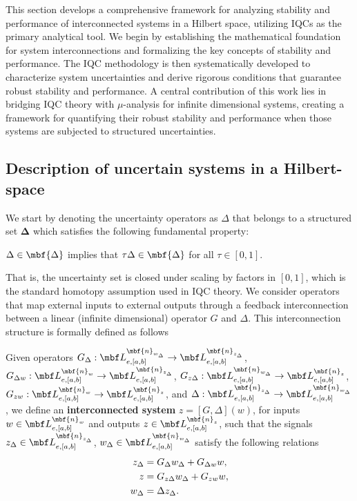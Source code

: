 This section develops a comprehensive framework for analyzing stability and performance of interconnected systems in a Hilbert space, utilizing IQCs as the primary analytical tool. We begin by establishing the mathematical foundation for system interconnections and formalizing the key concepts of stability and performance. The IQC methodology is then systematically developed to characterize system uncertainties and derive rigorous conditions that guarantee robust stability and performance. A central contribution of this work lies in bridging IQC theory with $\mu$-analysis for infinite dimensional systems, creating a framework for quantifying their robust stability and performance when those systems are subjected to structured uncertainties.
\subsection{Description of uncertain systems in a Hilbert-space}
We start by denoting the uncertainty operators as $\Delta$ that belongs to a structured set $\mathbf{\Delta}$ which satisfies the following fundamental property:
\begin{assumption}
	$\Delta\in\mbf{\Delta}$ implies that $\tau\Delta\in\mbf{\Delta}$ for all $\tau \in [0,1]$.
\end{assumption}
That is, the uncertainty set is closed under scaling by factors in $[0,1]$, which is the standard homotopy assumption used in IQC theory. We consider operators that map external inputs to external outputs through a feedback interconnection between a linear (infinite dimensional) operator $G$ and $\Delta$. This interconnection structure is formally defined as follows
\begin{definition}\label{def1}
	Given operators $G_\Delta : \mbf L_{e,[a,b]}^{\mbf{n}_{w_\Delta}} \to \mbf L_{e,[a,b]}^{\mbf{n}_{z_\Delta}}$, $G_{\Delta w} : \mbf L_{e,[a,b]}^{\mbf{n}_{w}} \to \mbf L_{e,[a,b]}^{\mbf{n}_{z_\Delta}}$, $G_{z\Delta} :\mbf L_{e,[a,b]}^{\mbf{n}_{w_\Delta}} \to \mbf L_{e,[a,b]}^{\mbf{n}_{z}}$, $G_{zw} :\mbf L_{e,[a,b]}^{\mbf{n}_{w}} \to \mbf L_{e,[a,b]}^{\mbf{n}_{z}}$, and $\Delta : \mbf L_{e,[a,b]}^{\mbf{n}_{z_\Delta}} \to \mbf L_{e,[a,b]}^{\mbf{n}_{w_\Delta}}$, we define an \textbf{interconnected system} $z = [G,\Delta] (w)$, for inputs $w \in \mbf L_{e,[a,b]}^{\mbf{n}_{w}}$ and outputs $z\in \mbf L_{e,[a,b]}^{\mbf{n}_{z}}$, such that the signals $z_\Delta \in \mbf L_{e,[a,b]}^{\mbf{n}_{z_\Delta}}$, $w_\Delta \in \mbf L_{e,[a,b]}^{\mbf{n}_{w_\Delta}}$ satisfy the following relations
	\begin{align}\label{eq:mappingOp}
		z_\Delta & = G_\Delta w_\Delta + G_{\Delta w} w, \\ \notag
		z        & = G_{z\Delta} w_\Delta + G_{zw} w,    \\
		w_\Delta & = \Delta z_\Delta. \notag
	\end{align}
\end{definition}
